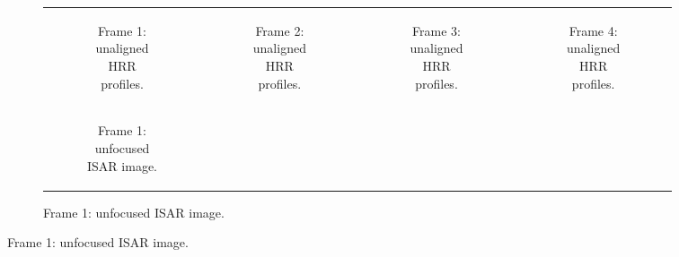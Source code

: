 \documentclass[class=report,11pt,crop=false]{standalone}
\begin{document}
    \begin{figure}[H]
        \begin{minipage}{0.9\linewidth}
            \begin{figure}
                \begin{tabular}{@{}cccc@{}}
                    \begin{subfigure}{0.25\linewidth}
                        \centering
                        \resizebox{\linewidth}{!}{}
                        \caption{Frame 1: unaligned HRR profiles. \label{subfig:measured_data_frames_HRRP_frame1}}
                    \end{subfigure}
                    &
                    \begin{subfigure}{0.25\linewidth}
                        \centering
                        \resizebox{\linewidth}{!}{}
                        \caption{Frame 2: unaligned HRR profiles.\label{subfig:measured_data_frames_HRRP_frame2}}
                    \end{subfigure}
                    &
                    \begin{subfigure}{0.25\linewidth}
                        \centering
                        \resizebox{\linewidth}{!}{}
                        \caption{Frame 3: unaligned HRR profiles.\label{subfig:measured_data_frames_HRRP_frame3}}
                    \end{subfigure}
                    &
                    \begin{subfigure}{0.25\linewidth}
                        \centering
                        \resizebox{\linewidth}{!}{}
                        \caption{Frame 4: unaligned HRR profiles. \label{subfig:measured_data_frames_HRRP_frame4}}
                    \end{subfigure}
                    \\
                    \begin{subfigure}{0.25\linewidth}
                        \centering
                        \resizebox{\linewidth}{!}{}
                        \caption{Frame 1: unfocused ISAR image.\label{subfig:measured_data_frames_ISAR_frame1}}
                    \end{subfigure}
                    &

\end{tabular}
\end{figure}
\end{minipage}
\end{figure}
\end{document}
